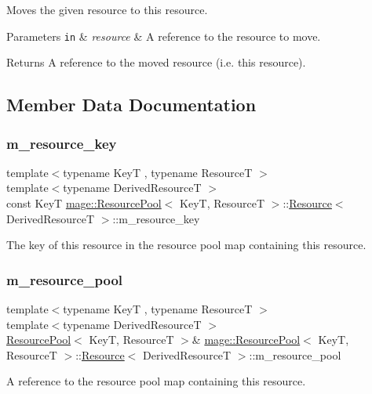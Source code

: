 Moves the given resource to this resource.


\begin{DoxyParams}[1]{Parameters}
\mbox{\tt in}  & {\em resource} & A reference to the resource to move. \\
\hline
\end{DoxyParams}
\begin{DoxyReturn}{Returns}
A reference to the moved resource (i.\+e. this resource). 
\end{DoxyReturn}


\subsection{Member Data Documentation}
\hypertarget{structmage_1_1_resource_pool_1_1_resource_a7980e0160d7b3ff4fc70ec4deabb443c}{}\label{structmage_1_1_resource_pool_1_1_resource_a7980e0160d7b3ff4fc70ec4deabb443c} 
\subsubsection{\texorpdfstring{m\+\_\+resource\+\_\+key}{m\_resource\_key}}
{\footnotesize\ttfamily template$<$typename KeyT , typename ResourceT $>$ \\
template$<$typename Derived\+ResourceT $>$ \\
const KeyT \hyperlink{classmage_1_1_resource_pool}{mage\+::\+Resource\+Pool}$<$ KeyT, ResourceT $>$\+::\hyperlink{structmage_1_1_resource_pool_1_1_resource}{Resource}$<$ Derived\+ResourceT $>$\+::m\+\_\+resource\+\_\+key\hspace{0.3cm}{\ttfamily [private]}}

The key of this resource in the resource pool map containing this resource. \hypertarget{structmage_1_1_resource_pool_1_1_resource_ab3810b406a481301673b74670b4cc92f}{}\label{structmage_1_1_resource_pool_1_1_resource_ab3810b406a481301673b74670b4cc92f} 
\subsubsection{\texorpdfstring{m\+\_\+resource\+\_\+pool}{m\_resource\_pool}}
{\footnotesize\ttfamily template$<$typename KeyT , typename ResourceT $>$ \\
template$<$typename Derived\+ResourceT $>$ \\
\hyperlink{classmage_1_1_resource_pool}{Resource\+Pool}$<$ KeyT, ResourceT $>$\& \hyperlink{classmage_1_1_resource_pool}{mage\+::\+Resource\+Pool}$<$ KeyT, ResourceT $>$\+::\hyperlink{structmage_1_1_resource_pool_1_1_resource}{Resource}$<$ Derived\+ResourceT $>$\+::m\+\_\+resource\+\_\+pool\hspace{0.3cm}{\ttfamily [private]}}

A reference to the resource pool map containing this resource. 